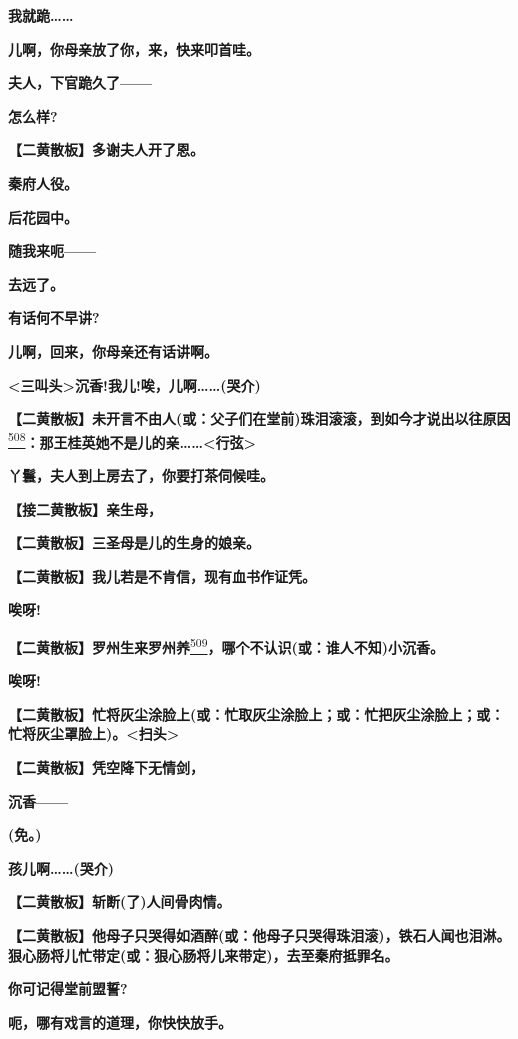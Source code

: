 \textbf{我就跪\ldots{}\ldots{}}

\textbf{儿啊，你母亲放了你，来，快来叩首哇。}

\textbf{夫人，下官跪久了------}

\textbf{怎么样?}

\textbf{【二黄散板】多谢夫人开了恩。}

\textbf{秦府人役。}

\textbf{后花园中。}

\textbf{随我来呃------}

\textbf{去远了。}

\textbf{有话何不早讲?}

\textbf{儿啊，回来，你母亲还有话讲啊。}

\textbf{\textless{}三叫头\textgreater{}沉香!我儿!唉，儿啊\ldots{}\ldots{}(哭介)}

\textbf{【二黄散板】未开言不由人(或：父子们在堂前)珠泪滚滚，到如今才说出以往原因}\protect\hyperlink{fn508}{\textsuperscript{508}}\textbf{：那王桂英她不是儿的亲\ldots{}\ldots{}\textless{}行弦\textgreater{}}

\textbf{丫鬟，夫人到上房去了，你要打茶伺候哇。}

\textbf{【接二黄散板】亲生母，}

\textbf{【二黄散板】三圣母是儿的生身的娘亲。}

\textbf{【二黄散板】我儿若是不肯信，现有血书作证凭。}

\textbf{唉呀!}

\textbf{【二黄散板】罗州生来罗州养}\protect\hyperlink{fn509}{\textsuperscript{509}}\textbf{，哪个不认识(或：谁人不知)小沉香。}

\textbf{唉呀!}

\textbf{【二黄散板】忙将灰尘涂脸上(或：忙取灰尘涂脸上；或：忙把灰尘涂脸上；或：忙将灰尘罩脸上)。\textless{}扫头\textgreater{}}

\textbf{【二黄散板】凭空降下无情剑，}

\textbf{沉香------}

\textbf{(免。)}

\textbf{孩儿啊\ldots{}\ldots{}(哭介)}

\textbf{【二黄散板】斩断(了)人间骨肉情。}

\textbf{【二黄散板】他母子只哭得如酒醉(或：他母子只哭得珠泪滚)，铁石人闻也泪淋。狠心肠将儿忙带定(或：狠心肠将儿来带定)，去至秦府抵罪名。}

\textbf{你可记得堂前盟誓?}

\textbf{呃，哪有戏言的道理，你快快放手。}

